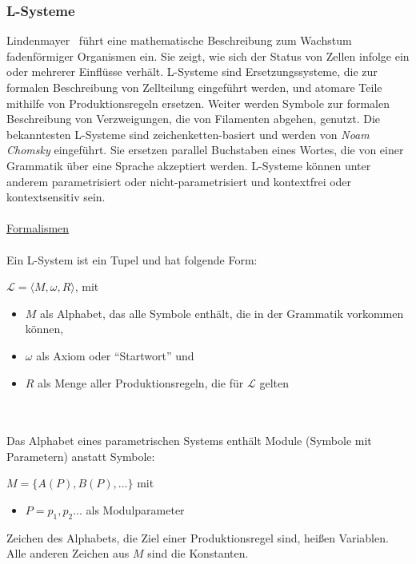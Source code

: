 \documentclass[11pt]{article}
\begin{document}
    \subsubsection{L-Systeme}
    Lindenmayer~\cite{3} führt eine mathematische Beschreibung zum Wachstum fadenförmiger Organismen ein.
    Sie zeigt, wie sich der Status von Zellen infolge ein oder mehrerer Einflüsse verhält.
    L-Systeme sind Ersetzungssysteme, die zur formalen Beschreibung von Zellteilung eingeführt werden, und atomare Teile
    mithilfe von Produktionsregeln ersetzen.
    Weiter werden Symbole zur formalen Beschreibung von Verzweigungen, die von Filamenten abgehen, genutzt.
    Die bekanntesten L-Systeme sind zeichenketten-basiert und werden von \textit{Noam Chomsky} eingeführt.
    Sie ersetzen parallel Buchstaben eines Wortes, die von einer Grammatik über eine Sprache akzeptiert werden.
    L-Systeme können unter anderem parametrisiert oder nicht-parametrisiert und kontextfrei oder kontextsensitiv sein.
    \\~\\
    \underline{Formalismen}\\~\\
    Ein L-System ist ein Tupel und hat folgende Form:
    \begin{center}
        $\mathcal{L}=\langle M,\omega,R \rangle$, mit
    \end{center}
    \begin{itemize}
        \item $M$ als Alphabet, das alle Symbole enthält, die in der Grammatik vorkommen können,
        \item $\omega$ als Axiom oder "`Startwort"' und
        \item $R$ als Menge aller Produktionsregeln, die für $\mathcal{L}$ gelten
    \end{itemize}
    \\~\\
    Das Alphabet eines parametrischen Systems enthält Module (Symbole mit Parametern) anstatt Symbole:
    \begin{center}
        $M=\{A(P),B(P),\dots\}$ mit
    \end{center}
    \begin{itemize}
        \item $P=p_1,p_2\dots$ als Modulparameter
    \end{itemize}
    Zeichen des Alphabets, die Ziel einer Produktionsregel sind, heißen Variablen.
    Alle anderen Zeichen aus $M$ sind die Konstanten.
    \\~\\
\end{document}

